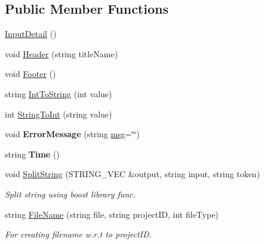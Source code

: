 \subsection*{Public Member Functions}
\begin{DoxyCompactItemize}
\item 
\hyperlink{classInputDetail_ab53655b14d922eb32b5d5d06c702e497}{Input\-Detail} ()
\item 
void \hyperlink{classInputDetail_ae55dcc0e15b85d302a09046b145330bb}{Header} (string title\-Name)
\item 
void \hyperlink{classInputDetail_acbc05b1bc6a371cf0a52222cc95e467d}{Footer} ()
\item 
string \hyperlink{classInputDetail_ad0a78d7c864bcccf7813a526d59573be}{Int\-To\-String} (int value)
\item 
int \hyperlink{classInputDetail_aaf532dd61f0aee82b116fef2da8e821f}{String\-To\-Int} (string value)
\item 
\hypertarget{classInputDetail_a7f1d6cf5e946dadd511c2437b796e5f7}{void {\bfseries Error\-Message} (string \hyperlink{classInputDetail_a1abb16cd695678c3fa05e3c812823fee}{msg}=\char`\"{}\char`\"{})}\label{classInputDetail_a7f1d6cf5e946dadd511c2437b796e5f7}

\item 
\hypertarget{classInputDetail_aaf6caee10a13697ca6dc2bc9aa02e8ab}{string {\bfseries Time} ()}\label{classInputDetail_aaf6caee10a13697ca6dc2bc9aa02e8ab}

\item 
void \hyperlink{classInputDetail_aba635a55313b14cf8bb285560a55498e}{Split\-String} (S\-T\-R\-I\-N\-G\-\_\-\-V\-E\-C \&output, string input, string token)
\begin{DoxyCompactList}\small\item\em Split string using boost library func. \end{DoxyCompactList}\item 
string \hyperlink{classInputDetail_a509ee6dd2de52e87cb764d0b0cceb05a}{File\-Name} (string file, string project\-I\-D, int file\-Type)
\begin{DoxyCompactList}\small\item\em For creating filename w.\-r.\-t to project\-I\-D. \end{DoxyCompactList}\end{DoxyCompactItemize}
